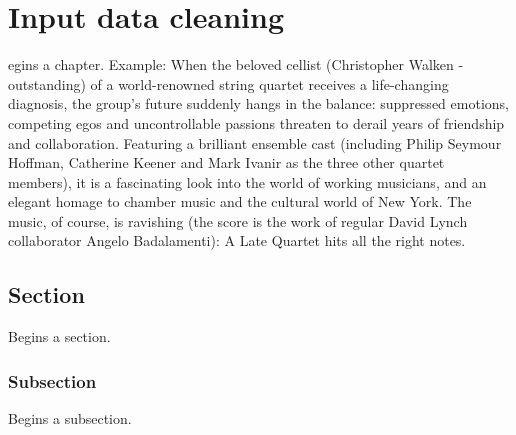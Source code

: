 %
%
\let\textcircled=\pgftextcircled
\chapter{Input data cleaning}
\label{chap:intro}

egins a chapter. Example: When the beloved cellist (Christopher Walken - outstanding) of a world-renowned string quartet receives a life-changing diagnosis, the group's future suddenly hangs in the balance: suppressed emotions, competing egos and uncontrollable passions threaten to derail years of friendship and collaboration. Featuring a brilliant ensemble cast (including Philip Seymour Hoffman, Catherine Keener and Mark Ivanir as the three other quartet members), it is a fascinating look into the world of working musicians, and an elegant homage to chamber music and the cultural world of New York. The music, of course, is ravishing (the score is the work of regular David Lynch collaborator Angelo Badalamenti): A Late Quartet hits all the right notes.

\section{Section}
\label{sec:sec01}

Begins a section.

\subsection{Subsection}
\label{subsec:subsec01}

Begins a subsection.

